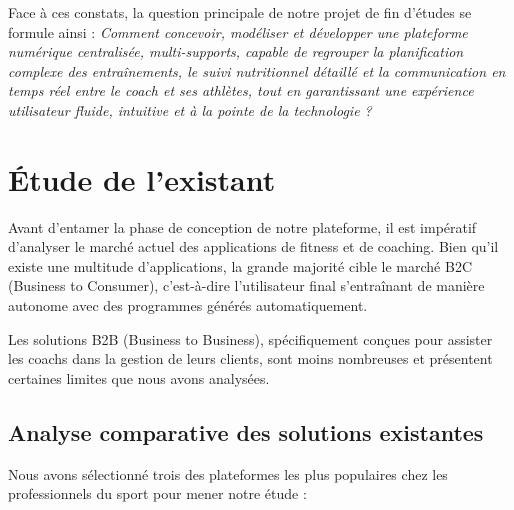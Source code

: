 Face à ces constats, la question principale de notre projet de fin d'études se formule ainsi : 
\textit{Comment concevoir, modéliser et développer une plateforme numérique centralisée, multi-supports, capable de regrouper la planification complexe des entraînements, le suivi nutritionnel détaillé et la communication en temps réel entre le coach et ses athlètes, tout en garantissant une expérience utilisateur fluide, intuitive et à la pointe de la technologie ?}

\section{Étude de l’existant}
Avant d'entamer la phase de conception de notre plateforme, il est impératif d'analyser le marché actuel des applications de fitness et de coaching. Bien qu'il existe une multitude d'applications, la grande majorité cible le marché B2C (Business to Consumer), c'est-à-dire l'utilisateur final s'entraînant de manière autonome avec des programmes générés automatiquement.

Les solutions B2B (Business to Business), spécifiquement conçues pour assister les coachs dans la gestion de leurs clients, sont moins nombreuses et présentent certaines limites que nous avons analysées.

\subsection{Analyse comparative des solutions existantes}
Nous avons sélectionné trois des plateformes les plus populaires chez les professionnels du sport pour mener notre étude :


